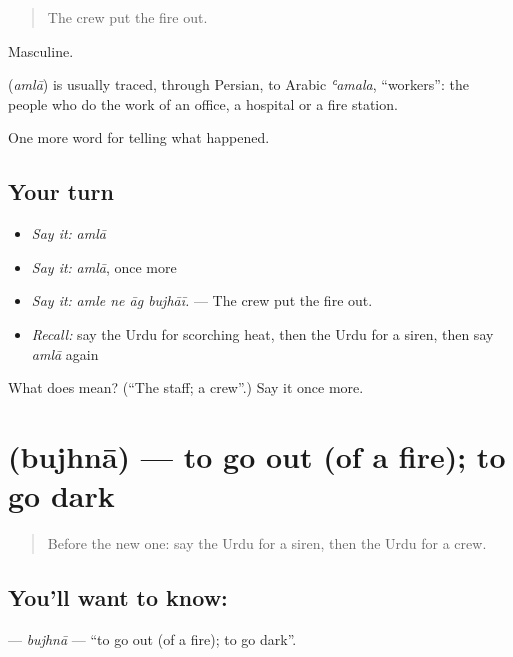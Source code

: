 \begin{quote}
The crew put the fire out.
\end{quote}

Masculine.

\begin{cousinweb}
\textbf{} (\emph{amlā}) is usually traced, through Persian, to Arabic \emph{ʿamala}, \textquotedblleft{}workers\textquotedblright{}: the people who do the work of an office, a hospital or a fire station.
\end{cousinweb}

\begin{grammarlens}[title={What you've built}]
One more word for telling what happened.
\end{grammarlens}

\subsection*{Your turn}
\begin{itemize}
\raggedright
  \item \emph{Say it:} \emph{amlā}
  \item \emph{Say it:} \emph{amlā}, once more
  \item \emph{Say it:} \emph{amle ne āg bujhāī.} — The crew put the fire out.
  \item \emph{Recall:} say the Urdu for scorching heat, then the Urdu for a siren, then say \emph{amlā} again
\end{itemize}

\begin{tcolorbox}[breakable,colback=teal!4,colframe=teal!35!black,title={Before you move on}]
What does  mean? (\textquotedblleft{}The staff; a crew\textquotedblright{}.) Say it once more.
\end{tcolorbox}
\section[\texorpdfstring{\ur{بجھنا} (bujhnā)}{بجھنا (bujhnā)}]{ (bujhnā) — to go out (of a fire); to go dark}

\label{lesson:UR-C289-bujhna}



\begin{quote}
Before the new one: say the Urdu for a siren, then the Urdu for a crew.
\end{quote}

\subsection*{You'll want to know: }
\textbf{} — \emph{bujhnā} — \textquotedblleft{}to go out (of a fire); to go dark\textquotedblright{}.

